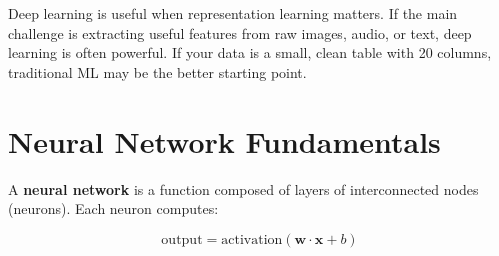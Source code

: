 \documentclass[12pt, a4paper, oneside]{book}
\begin{document}
\begin{intuitionbox}
Deep learning is useful when representation learning matters. If the main challenge is extracting useful features from raw images, audio, or text, deep learning is often powerful. If your data is a small, clean table with 20 columns, traditional ML may be the better starting point.
\end{intuitionbox}

\section{Neural Network Fundamentals}

A \textbf{neural network} is a function composed of layers of interconnected nodes (neurons). Each neuron computes:

$$\text{output} = \text{activation}(\mathbf{w} \cdot \mathbf{x} + b)$$
\end{document}
